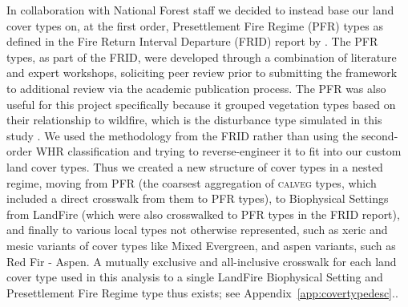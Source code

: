 In collaboration with National Forest staff we decided to instead base our land cover types on, at the first order, Presettlement Fire Regime (PFR) types as defined in the Fire Return Interval Departure (FRID) report by \citet{VandeWater2011}. The PFR types, as part of the FRID, were developed through a combination of literature and expert workshops, soliciting peer review prior to submitting the framework to additional review via the academic publication process. The PFR was also useful for this project specifically because it grouped vegetation types based on their relationship to wildfire, which is the disturbance type simulated in this study \citep{VandeWater2011}. We used the methodology from the FRID rather than using the second-order WHR classification and trying to reverse-engineer it to fit into our custom land cover types. Thus we created a new structure of cover types in a nested regime, moving from PFR (the coarsest aggregation of \textsc{calveg} types, which included a direct crosswalk from them to PFR types), to Biophysical Settings from LandFire (which were also crosswalked to PFR types in the FRID report), and finally to various local types not otherwise represented, such as xeric and mesic variants of cover types like Mixed Evergreen, and aspen variants, such as Red Fir - Aspen. A mutually exclusive and all-inclusive crosswalk for each land cover type used in this analysis to a single LandFire Biophysical Setting and Presettlement Fire Regime type thus exists; see Appendix~\ref{app:covertypedesc}..

